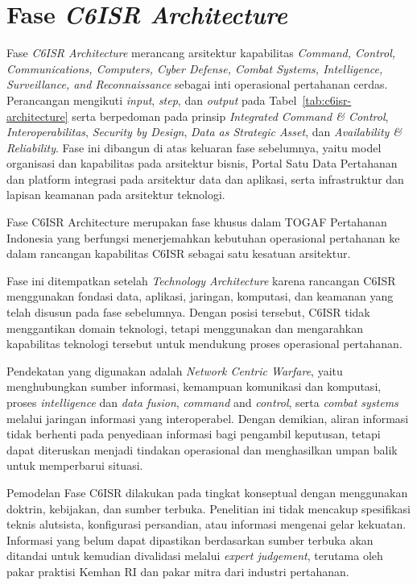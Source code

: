 \section{Fase \textit{C6ISR Architecture}}

Fase \textit{C6ISR Architecture} merancang arsitektur kapabilitas \textit{Command, Control, Communications, Computers, Cyber Defense, Combat Systems, Intelligence, Surveillance, and Reconnaissance} sebagai inti operasional pertahanan cerdas. Perancangan mengikuti \textit{input}, \textit{step}, dan \textit{output} pada Tabel~\ref{tab:c6isr-architecture} serta berpedoman pada prinsip \textit{Integrated Command \& Control}, \textit{Interoperabilitas}, \textit{Security by Design}, \textit{Data as Strategic Asset}, dan \textit{Availability \& Reliability}. Fase ini dibangun di atas keluaran fase sebelumnya, yaitu model organisasi dan kapabilitas pada arsitektur bisnis, Portal Satu Data Pertahanan dan platform integrasi pada arsitektur data dan aplikasi, serta infrastruktur dan lapisan keamanan pada arsitektur teknologi.

Fase C6ISR Architecture merupakan fase khusus dalam TOGAF Pertahanan Indonesia yang berfungsi menerjemahkan kebutuhan operasional pertahanan ke dalam rancangan kapabilitas C6ISR sebagai satu kesatuan arsitektur.

Fase ini ditempatkan setelah \textit{Technology Architecture} karena rancangan C6ISR menggunakan fondasi data, aplikasi, jaringan, komputasi, dan keamanan yang telah disusun pada fase sebelumnya. Dengan posisi tersebut, C6ISR tidak menggantikan domain teknologi, tetapi menggunakan dan mengarahkan kapabilitas teknologi tersebut untuk mendukung proses operasional pertahanan.

Pendekatan yang digunakan adalah \textit{Network Centric Warfare}, yaitu menghubungkan sumber informasi, kemampuan komunikasi dan komputasi, proses \textit{intelligence} dan \textit{data fusion}, \textit{command} and \textit{control}, serta \textit{combat systems} melalui jaringan informasi yang interoperabel. Dengan demikian, aliran informasi tidak berhenti pada penyediaan informasi bagi pengambil keputusan, tetapi dapat diteruskan menjadi tindakan operasional dan menghasilkan umpan balik untuk memperbarui situasi.

Pemodelan Fase C6ISR dilakukan pada tingkat konseptual dengan menggunakan doktrin, kebijakan, dan sumber terbuka. Penelitian ini tidak mencakup spesifikasi teknis alutsista, konfigurasi persandian, atau informasi mengenai gelar kekuatan. Informasi yang belum dapat dipastikan berdasarkan sumber terbuka akan ditandai untuk kemudian divalidasi melalui \textit{expert judgement}, terutama oleh pakar praktisi Kemhan RI dan pakar mitra dari industri pertahanan.

